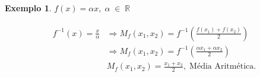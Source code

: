 \documentclass[a4,10pt]{article} %
\newtheorem{example}{Exemplo}
\begin{document}
	\begin{example}
		$	f(x) = \alpha x, \; \alpha \; \in \; \mathbb{R}$	
	\end{example}
	\begin{multline*}
	\begin{split}
	f^{-1}(x) = \frac{x}{\alpha} &\Rightarrow M_f(x_1, x_2) = f^{-1} \left( \frac{f(x_1) + f(x_2)}{2} \right)\\
	&\Rightarrow M_f(x_1, x_2) = f^{-1} \left( \frac{\alpha x_1 + \alpha x_2}{2} \right) \\
	&\boxed{M_f(x_1, x_2) = \frac{x_1 + x_2}{2}}, \; \text{Média Aritmética.}
	\end{split}
	\end{multline*}
	
\end{document}
